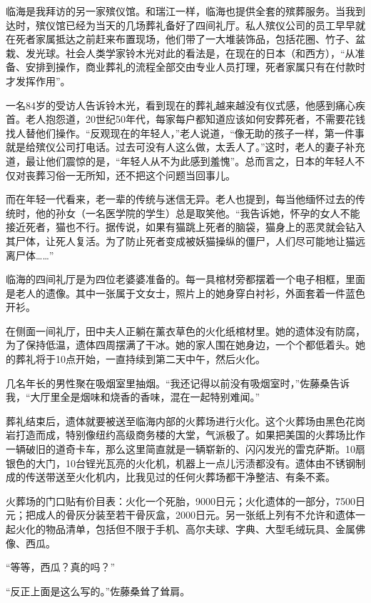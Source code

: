 \documentclass[12pt,oneside]{book}
\begin{document}
临海是我拜访的另一家殡仪馆。和瑞江一样，临海也提供全套的殡葬服务。当我到达时，殡仪馆已经为当天的几场葬礼备好了四间礼厅。私人殡仪公司的员工早早就在死者家属抵达之前赶来布置现场，他们带了一大堆装饰品，包括花圈、竹子、盆栽、发光球。社会人类学家铃木光对此的看法是，在现在的日本（和西方），“从准备、安排到操作，商业葬礼的流程全部交由专业人员打理，死者家属只有在付款时才发挥作用”。

一名84岁的受访人告诉铃木光，看到现在的葬礼越来越没有仪式感，他感到痛心疾首。老人抱怨道，20世纪50年代，每家每户都知道应该如何安葬死者，不需要花钱找人替他们操作。“反观现在的年轻人，”老人说道，“像无助的孩子一样，第一件事就是给殡仪公司打电话。过去可没有人这么做，太丢人了。”这时，老人的妻子补充道，最让他们震惊的是，“年轻人从不为此感到羞愧”。总而言之，日本的年轻人不仅对丧葬习俗一无所知，还不把这个问题当回事儿。

而在年轻一代看来，老一辈的传统与迷信无异。老人也提到，每当他缅怀过去的传统时，他的孙女（一名医学院的学生）总是取笑他。“我告诉她，怀孕的女人不能接近死者，猫也不行。据传说，如果有猫跳上死者的脑袋，猫身上的恶灵就会钻入其尸体，让死人复活。为了防止死者变成被妖猫操纵的僵尸，人们尽可能地让猫远离尸体……”

临海的四间礼厅是为四位老婆婆准备的。每一具棺材旁都摆着一个电子相框，里面是老人的遗像。其中一张属于文女士，照片上的她身穿白衬衫，外面套着一件蓝色开衫。

在侧面一间礼厅，田中夫人正躺在薰衣草色的火化纸棺材里。她的遗体没有防腐，为了保持低温，遗体四周摆满了干冰。她的家人围在她身边，一个个都低着头。她的葬礼将于10点开始，一直持续到第二天中午，然后火化。

几名年长的男性聚在吸烟室里抽烟。“我还记得以前没有吸烟室时，”佐藤桑告诉我，“大厅里全是烟味和烧香的香味，混在一起特别难闻。”

葬礼结束后，遗体就要被送至临海内部的火葬场进行火化。这个火葬场由黑色花岗岩打造而成，特别像纽约高级商务楼的大堂，气派极了。如果把美国的火葬场比作一辆破旧的道奇卡车，那么这里简直就是一辆崭新的、闪闪发光的雷克萨斯。10扇银色的大门，10台锃光瓦亮的火化机，机器上一点儿污渍都没有。遗体由不锈钢制成的传送带送至火化机内，比我见过的任何火葬场都干净整洁、有条不紊。

火葬场的门口贴有价目表：火化一个死胎，9000日元；火化遗体的一部分，7500日元；把成人的骨灰分装至若干骨灰盒，2000日元。另一张纸上列有不允许和遗体一起火化的物品清单，包括但不限于手机、高尔夫球、字典、大型毛绒玩具、金属佛像、西瓜。

“等等，西瓜？真的吗？”

“反正上面是这么写的。”佐藤桑耸了耸肩。
\end{document}
